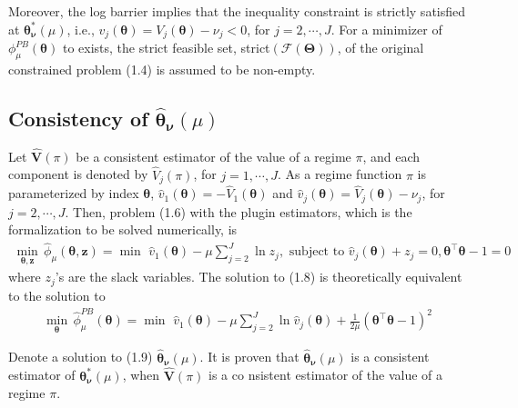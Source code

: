 \documentclass{article}
\newcommand{\wh}{\widehat}
\newcommand{\itl}{\intercal}
\newcommand{\bs}{ \boldsymbol}
\newcommand{\ml}{\mathcal}
\newcommand{\lt}{\left}
\newcommand{\rt}{\right}
\begin{document}
Moreover, the log barrier implies that the inequality constraint is strictly satisfied at $\bs{\theta}_{\bs{\nu}}^{*}(\mu)$, i.e., $v_j\lt(\bs{\theta}\rt) = V_j\lt(\bs{\theta}\rt) - \nu_j < 0$, for $j = 2, \cdots, J$. For a minimizer of $\phi^{PB}_{\mu}(\bs{\theta})$ to exists,  the strict feasible set, strict$(\ml{F}(\bs{\Theta}))$, of the original constrained problem (1.4) is assumed to be non-empty. 

\subsection{Consistency of $\wh{\bs{\theta}}_{\bs{\nu}}\lt(\mu\rt)$}
Let $\wh{\bs{V}}(\pi)$ be a consistent estimator of the value of a regime $\pi$, and each component is denoted by $\wh{V}_j(\pi)$, for $j = 1, \cdots, J$. As a regime function $\pi$ is parameterized by index $\bs{\theta}$,  $\wh{v}_1\lt(\bs{\theta}\rt)=-\wh{V}_1\lt(\bs{\theta}\rt)$ and  $\wh{v}_j\lt(\bs{\theta}\rt) = \wh{V}_j\lt(\bs{\theta}\rt) - \nu_j$, for $j = 2, \cdots, J$. Then, problem (1.6) with the plugin estimators, which is the formalization to be solved numerically, is 
\begin{equation}
\begin{gathered}
\min_{\bs{\theta}, \bs{z}} \, \wh{\phi}_{\mu}(\bs{\theta}, \bs{z}) = \min \,\,\wh{v}_1(\bs{\theta}) - \mu \sum_{j=2}^J \ln z_j, \text{ subject to } \wh{v}_j(\bs{\theta})  + z_j = 0, \bs{\theta}^{\itl}\bs{\theta} - 1= 0
\end{gathered}
\end{equation}
where $z_j$'s are the slack variables. The solution to (1.8) is theoretically equivalent to the solution to 
\begin{equation}
\begin{gathered}
\min_{\bs{\theta}} \, \wh{\phi}^{PB}_{\mu}\lt(\bs{\theta}\rt) = \min \,\,\wh{v}_1(\bs{\theta}) - \mu \sum_{j=2}^J \ln \wh{v}_j\lt( \bs{\theta}\rt) + \frac{1}{2\mu} \lt(\bs{\theta}^{\itl}\bs{\theta} - 1\rt)^2
\end{gathered}
\end{equation} 

Denote a solution to (1.9) $\wh{\bs{\theta}}_{\bs{\nu}}\lt(\mu\rt)$. It is proven that $\wh{\bs{\theta}}_{\bs{\nu}}\lt(\mu\rt)$ is a consistent estimator of $\bs{\theta}^*_{\bs{\nu}}\lt(\mu\rt)$, when $\wh{\bs{V}}(\pi)$ is a co  nsistent estimator of the value of a regime $\pi$.


\end{document}
